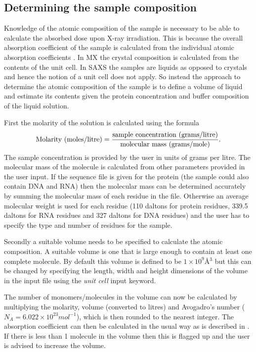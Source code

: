 \subsection{Determining the sample composition}
\label{sub:Determining the sample composition}
Knowledge of the atomic composition of the sample is necessary to be able to calculate the absorbed dose upon X-ray irradiation.
This is because the overall absorption coefficient of the sample is calculated from the individual atomic absorption coefficients \cite{murray2004}.
In MX the crystal composition is calculated from the contents of the unit cell.
In SAXS the samples are liquids as opposed to crystals and hence the notion of a unit cell does not apply.
So instead the approach to determine the atomic composition of the sample is to define a volume of liquid and estimate its contents given the protein concentration and buffer composition of the liquid solution.

First the molarity of the solution is calculated using the formula
\begin{equation}
    \text{Molarity (moles/litre)} = \frac{\text{sample concentration (grams/litre)}}{\text{molecular mass (grams/mole)}}.
    \label{eq:molarity calculation}
\end{equation}
The sample concentration is provided by the user in units of grams per litre.
The molecular mass of the molecule is calculated from other parameters provided in the user input.
If the sequence file is given for the protein (the sample could also contain DNA and RNA) then the molecular mass can be determined accurately by summing the molecular mass of each residue in the file.
Otherwise an average molecular weight is used for each residue (110 daltons for protein residues, 339.5 daltons for RNA residues and 327 daltons for DNA residues) and the user has to specify the type and number of residues for the sample.

Secondly a suitable volume needs to be specified to calculate the atomic composition.
A suitable volume is one that is large enough to contain at least one complete molecule.
By default this volume is defined to be $1 \times 10^9$\AA$^3$ but this can be changed by specifying the length, width and height dimensions of the volume in the input file using the \textit{unit cell} input keyword.

The number of monomers/molecules in the volume can now be calculated by multiplying the molarity, volume (converted to litres) and Avogadro's number ($N_A = 6.022 \times 10^{23} mol^{-1}$), which is then rounded to the nearest integer.
The absorption coefficient can then be calculated in the usual way as is described in \cite{pait2009}.
If there is less than 1 molecule in the volume then this is flagged up and the user is advised to increase the volume.

